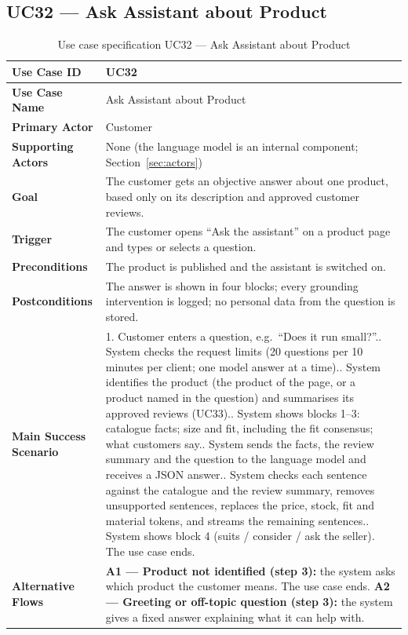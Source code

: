 \documentclass[11pt,a4paper,oneside]{extreport}
\newif\ifshowvtwo
\newcommand{\vtwocolor}{\ifshowvtwo\color{red}\fi}
\newcommand{\upd}[1]{\ifshowvtwo\textcolor{red}{#1}\else#1\fi}
\newcommand{\ucrow}[2]{\textbf{#1} & #2 \\ \midrule}
\begin{document}
\subsection{\upd{UC32 --- Ask Assistant about Product}}
\label{subsec:uc32}
{\small\vtwocolor
\begin{xltabular}{\textwidth}{@{}L{3.1cm} Y@{}}
\caption{Use case specification UC32 --- Ask Assistant about Product}\label{tab:uc32}\\
\toprule
\endfirsthead
\toprule
\endhead
\bottomrule
\endlastfoot
\ucrow{Use Case ID}{UC32}
\ucrow{Use Case Name}{Ask Assistant about Product}
\ucrow{Primary Actor}{Customer}
\ucrow{Supporting Actors}{None (the language model is an internal component; Section~\ref{sec:actors})}
\ucrow{Goal}{The customer gets an objective answer about one product, based only on its description and approved customer reviews.}
\ucrow{Trigger}{The customer opens ``Ask the assistant'' on a product page and types or selects a question.}
\ucrow{Preconditions}{The product is published and the assistant is switched on.}
\ucrow{Postconditions}{The answer is shown in four blocks; every grounding intervention is logged; no personal data from the question is stored.}
\ucrow{Main Success Scenario}{%
1. Customer enters a question, e.g.\ ``Does it run small?''.\newline
2. System checks the request limits (20 questions per 10 minutes per client; one model answer at a time).\newline
3. System identifies the product (the product of the page, or a product named in the question) and summarises its approved reviews (UC33).\newline
4. System shows blocks 1--3: catalogue facts; size and fit, including the fit consensus; what customers say.\newline
5. System sends the facts, the review summary and the question to the language model and receives a JSON answer.\newline
6. System checks each sentence against the catalogue and the review summary, removes unsupported sentences, replaces the price, stock, fit and material tokens, and streams the remaining sentences.\newline
7. System shows block 4 (suits / consider / ask the seller). The use case ends.}
\ucrow{Alternative Flows}{%
\textbf{A1 --- Product not identified (step 3):} the system asks which product the customer means. The use case ends.\newline
\textbf{A2 --- Greeting or off-topic question (step 3):} the system gives a fixed answer explaining what it can help with.\newline
}
\end{xltabular}}
\end{document}
